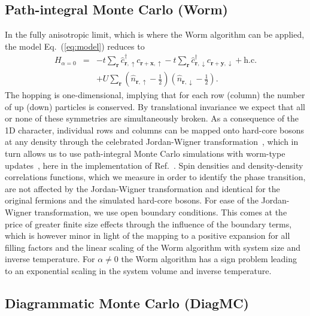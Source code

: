 \documentclass[twocolumn,superscriptaddress,pra,showpacs,longbibliography]{revtex4-1}
\newcommand{\Eq}[1]{Eq.~(\ref{#1})}
\newcommand{\<}{\langle}
\renewcommand{\>}{\rangle}
\begin{document}
\subsection{Path-integral Monte Carlo (Worm)~\label{sec:wormalgorithm}}
In the fully anisotropic limit, which is where the Worm algorithm can be applied, the model \Eq{eq:model} reduces to
\begin{eqnarray}
H_{\alpha=0} & = &  -t \sum_{\mathbf{r}} \hat{c}^{\dagger}_{\mathbf{r}, \uparrow} c_{\mathbf{r} + \mathbf{x}, \uparrow} - t \sum_{\mathbf{r}} \hat{c}^{\dagger}_{\mathbf{r}, \downarrow} c_{\mathbf{r} + \mathbf{y} , \downarrow} + \textrm{h.c.} \nonumber \\
{} &{} & + U \sum_{\mathbf{r}} \left(\hat{n}_{\mathbf{r}, \uparrow} - \frac{1}{2}  \right) \left( \hat{n}_{\mathbf{r}, \downarrow} - \frac{1}{2}   \right).
\label{eq:alpha0}
\end{eqnarray}
The hopping is one-dimensional, implying that for each row (column) the number of up (down) particles is conserved.  By translational invariance we expect that all or none of these symmetries are simultaneously broken. %
As a consequence of the 1D character, individual rows and columns can be mapped onto hard-core bosons at any density through the celebrated Jordan-Wigner transformation~\cite{Cazalilla2011, Giamarchi_book}, which in turn allows us to use path-integral Monte Carlo simulations with worm-type updates~\cite{Prokofev1998}, here in the implementation of Ref.~\cite{Pollet2007}.
Spin densities and density-density correlations functions, which we measure in order to identify the phase transition, are not affected by the Jordan-Wigner transformation and identical for the original fermions and the simulated hard-core bosons.
For ease of the Jordan-Wigner transformation, we use open boundary conditions. This comes at the price of greater finite size effects through the influence of the boundary terms, which is however minor in light of the mapping to a positive expansion for all filling factors and the linear scaling of the Worm algorithm with system size and inverse temperature. For $\alpha \neq 0$ the Worm algorithm has a sign problem leading to an exponential scaling in the system volume and inverse temperature.


\subsection{Diagrammatic Monte Carlo (DiagMC)}
\end{document}
